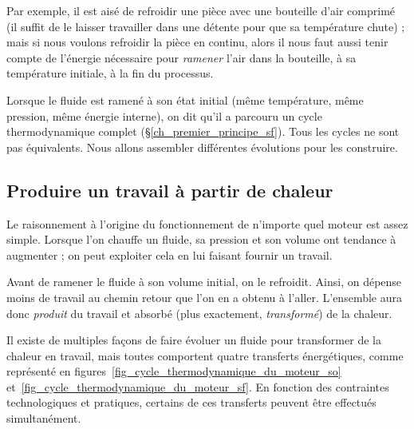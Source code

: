 		Par exemple, il est aisé de refroidir une pièce avec une bouteille d’air comprimé (il suffit de le laisser travailler dans une détente pour que sa température chute) ; mais si nous voulons refroidir la pièce en continu, alors il nous faut aussi tenir compte de l’énergie nécessaire pour \textit{ramener} l’air dans la bouteille, à sa température initiale, à la fin du processus.

		Lorsque le fluide est ramené à son état initial (même température, même pression, même énergie interne), on dit qu’il a parcouru un cycle thermodynamique complet (\S\ref{ch_premier_principe_sf}).
		Tous les cycles ne sont pas équivalents. Nous allons assembler différentes évolutions pour les construire.


	\subsection{Produire un travail à partir de chaleur}
	\label{ch_principe_fonctionnement_moteur}

		Le raisonnement à l’origine du fonctionnement de n’importe quel moteur est assez simple. Lorsque l’on chauffe un fluide, sa pression et son volume ont tendance à augmenter ; on peut exploiter cela en lui faisant fournir un travail. 

		Avant de ramener le fluide à son volume initial, on le refroidit. Ainsi, on dépense moins de travail au chemin retour que l’on en a obtenu à l’aller. L’ensemble aura donc \emph{produit} du travail et absorbé (plus exactement, \emph{transformé}) de la chaleur.

		Il existe de multiples façons de faire évoluer un fluide pour transformer de la chaleur en travail, mais  toutes comportent quatre transferts énergétiques, comme représenté en figures~\ref{fig_cycle_thermodynamique_du_moteur_so} et~\ref{fig_cycle_thermodynamique_du_moteur_sf}. En fonction des contraintes technologiques et pratiques, certains de ces transferts peuvent être effectués simultanément.

